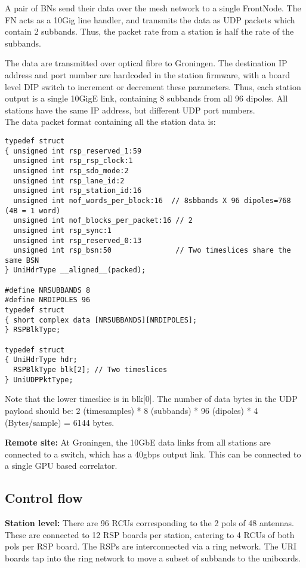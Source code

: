\documentclass {article}
\begin{document}
A pair of BNs send their data over the mesh network to a single FrontNode. The
FN acts as a  10Gig line handler, and transmits the data  as UDP packets which
contain 2 subbands. Thus,  the packet rate from a station is  half the rate of
the subbands.

The data  are transmitted  over optical fibre  to Groningen. The  destination IP
address and  port number  are hardcoded  in the station  firmware, with  a board
level DIP switch to increment  or decrement these parameters. Thus, each station
output is a  single 10GigE link, containing 8 subbands from  all 96 dipoles. All
stations have the same IP address, but different UDP port numbers.\\

The data packet format containing all the station data is:
\begin{lstlisting}
typedef struct
{ unsigned int rsp_reserved_1:59
  unsigned int rsp_rsp_clock:1
  unsigned int rsp_sdo_mode:2
  unsigned int rsp_lane_id:2
  unsigned int rsp_station_id:16
  unsigned int nof_words_per_block:16  // 8sbbands X 96 dipoles=768 (4B = 1 word)
  unsigned int nof_blocks_per_packet:16 // 2
  unsigned int rsp_sync:1
  unsigned int rsp_reserved_0:13
  unsigned int rsp_bsn:50               // Two timeslices share the same BSN
} UniHdrType __aligned__(packed);

#define NRSUBBANDS 8
#define NRDIPOLES 96
typedef struct
{ short complex data [NRSUBBANDS][NRDIPOLES];
} RSPBlkType;

typedef struct
{ UniHdrType hdr;
  RSPBlkType blk[2]; // Two timeslices 
} UniUDPPktType;

\end{lstlisting}

Note that the lower timeslice is in  blk[0]. The number of data bytes in the UDP
payload  should  be:  2  (timesamples) * 8  (subbands) * 96  (dipoles)  *  4
(Bytes/sample) = 6144 bytes.

\textbf{Remote site:} At  Groningen, the 10GbE data links  from all stations are
connected to a switch, which has a  40gbps output link. This can be connected to
a single GPU based correlator.

\subsection {Control flow}
\textbf {Station  level:} There are  96 RCUs corresponding  to the 2 pols  of 48
antennas. These are  connected to 12 RSP boards per station,  catering to 4 RCUs
of both pols per RSP board.  The RSPs are interconnected via a ring network. The
URI  boards tap  into the  ring network  to  move a  subset of  subbands to  the
uniboards.
\end{document}
